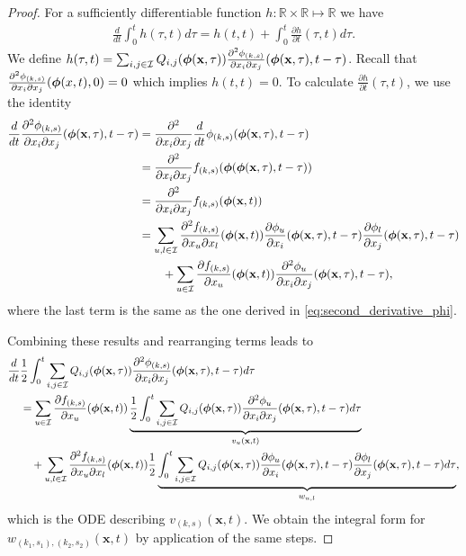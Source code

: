 \documentclass[acmsmall]{acmart}
\newcommand\bx{\mathbf{x}}
\newcommand\bphi{\text{\boldmath$\phi$}}
\newcommand\calI{\mathcal{I}}
\newcommand{\R}{\ensuremath{\mathbb{R}}}
\newcommand{\dd}[3]{ \frac{\partial^2 #1 }{ \partial x_{#2} \partial x_{#3}}}
\begin{document}
\begin{proof}
For a sufficiently differentiable function $h:\R \times \R \mapsto \R$ we have 
\begin{align*}
  \frac{d}{dt}\int_0^t h(\tau,t)d\tau = h(t,t) + \int_0^t \frac{\partial h}{\partial t} (\tau,t)d\tau.
\end{align*}
We define $h(\tau, t) = \sum_{i,j\in\calI} Q_{i,j}(\bphi(\bx,\tau))\dd{\phi_{(k,s)}}{i}{j}(\bphi(\bx,\tau),t-\tau)$. Recall that $\dd{\phi_{(k,s)}}{i}{j}(\bphi(x,t),0) = 0$ which implies $h(t,t) = 0$. To calculate $\frac{\partial h}{\partial t}(\tau, t)$, we use the identity 
\begin{align*}
\frac{d}{dt}\dd{\phi_{(k,s)}}{i}{j}(\bphi(\bx,\tau),t-\tau) &= \dd{}{i}{j} \frac{d}{dt} \phi_{(k,s)} (\bphi(\bx,\tau),t-\tau)\\
&= \dd{}{i}{j}f_{(k,s)}(\bphi(\bphi(\bx,\tau),t-\tau)) \\
&= \dd{}{i}{j}f_{(k,s)}(\bphi(\bx,t))\\
& = \sum_{u,l\in \calI} \dd{f_{(k,s)}}{u}{l}(\bphi(\bx,t)) \frac{\partial \phi_u}{\partial x_i}(\bphi(\bx,\tau),t-\tau) \frac{\partial \phi_l}{\partial x_j}(\bphi(\bx,\tau),t-\tau)\\
& \qquad  + \sum_{u\in\calI} \frac{\partial f_{(k,s)}}{\partial x_u}(\bphi(\bx,t)) \dd{\phi_u}{i}{j}(\bphi(\bx,\tau),t-\tau),
\end{align*}
where the last term is the same as the one derived in \eqref{eq:second_derivative_phi}. 

Combining these results and rearranging terms leads to 
\begin{align*}
\frac{d}{dt} &\frac{1}{2}\int_0^t\sum_{i,j\in\calI} Q_{i,j}(\bphi(\bx,\tau))\dd{\phi_{(k,s)}}{i}{j}(\bphi(\bx,\tau),t-\tau)d\tau \\
& = \sum_{u \in \calI} \frac{\partial f_{(k,s)}}{\partial x_u}(\bphi(\bx,t)) \underbrace{\frac{1}{2}\int_0^t \sum_{i,j\in\calI} Q_{i,j}(\bphi(\bx,\tau)) \dd{\phi_u}{i}{j}(\bphi(\bx,\tau),t-\tau) d\tau}_{v_u(\bx,t)} \\
& \quad + \sum_{u,l\in \calI} \dd{f_{(k,s)}}{u}{l}(\bphi(\bx,t)) \frac{1}{2}\underbrace{\int_0^t \sum_{i,j\in\calI} Q_{i,j}(\bphi(\bx,\tau)) \frac{\partial \phi_u}{\partial x_i}(\bphi(\bx,\tau),t-\tau) \frac{\partial \phi_l}{\partial x_j}(\bphi(\bx,\tau),t-\tau) d\tau}_{w_{u,l}},
\end{align*}
which is the ODE describing $v_{(k,s)}(\bx,t)$. We obtain the integral form for $w_{(k_1,s_1),(k_2,s_2)}(\bx, t)$ by application of the same steps. 

\end{proof}
\end{document}
